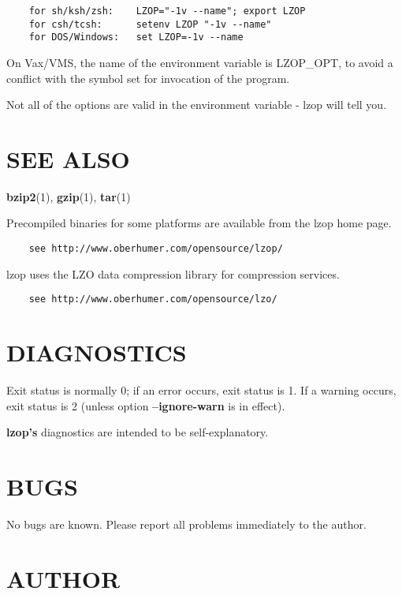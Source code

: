 \begin{verbatim}
    for sh/ksh/zsh:    LZOP="-1v --name"; export LZOP
    for csh/tcsh:      setenv LZOP "-1v --name"
    for DOS/Windows:   set LZOP=-1v --name
\end{verbatim}


On Vax/VMS, the name of the environment variable is
LZOP\_OPT, to avoid a conflict with the symbol set for
invocation of the program.



Not all of the options are valid in the environment variable -
lzop will tell you.

\section{SEE ALSO\label{SEE_ALSO}}


\textbf{bzip2}(1), \textbf{gzip}(1), \textbf{tar}(1)



Precompiled binaries for some platforms are available
from the lzop home page.

\begin{verbatim}
    see http://www.oberhumer.com/opensource/lzop/
\end{verbatim}


lzop uses the LZO data compression library for compression
services.

\begin{verbatim}
    see http://www.oberhumer.com/opensource/lzo/
\end{verbatim}
\section{DIAGNOSTICS\label{DIAGNOSTICS}}


Exit status is normally 0; if an error occurs, exit status
is 1. If a warning occurs, exit status is 2 (unless
option \textbf{--ignore-warn} is in effect).



\textbf{lzop's} diagnostics are intended to be self-explanatory.

\section{BUGS\label{BUGS}}


No bugs are known. Please report all problems immediately to the author.

\section{AUTHOR\label{AUTHOR}}


